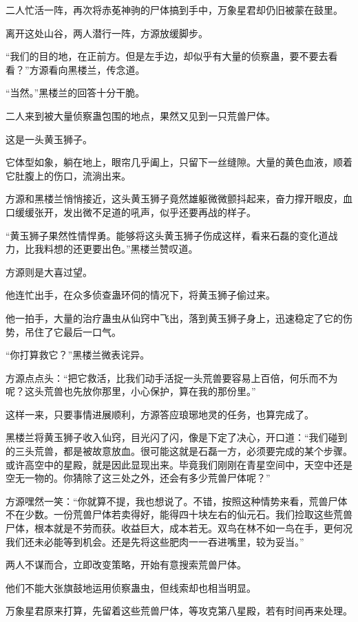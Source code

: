\begin{this_body}
二人忙活一阵，再次将赤莬神驹的尸体搞到手中，万象星君却仍旧被蒙在鼓里。

离开这处山谷，两人潜行一阵，方源放缓脚步。

“我们的目的地，在正前方。但是左手边，却似乎有大量的侦察蛊，要不要去看看？”方源看向黑楼兰，传念道。

“当然。”黑楼兰的回答十分干脆。

二人来到被大量侦察蛊包围的地点，果然又见到一只荒兽尸体。

这是一头黄玉狮子。

它体型如象，躺在地上，眼帘几乎阖上，只留下一丝缝隙。大量的黄色血液，顺着它肚腹上的伤口，流淌出来。

方源和黑楼兰悄悄接近，这头黄玉狮子竟然雄躯微微颤抖起来，奋力撑开眼皮，血口缓缓张开，发出微不足道的吼声，似乎还要再战的样子。

“黄玉狮子果然性情悍勇。能够将这头黄玉狮子伤成这样，看来石磊的变化道战力，比我料想的还更要出色。”黑楼兰赞叹道。

方源则是大喜过望。

他连忙出手，在众多侦查蛊环伺的情况下，将黄玉狮子偷过来。

他一拍手，大量的治疗蛊虫从仙窍中飞出，落到黄玉狮子身上，迅速稳定了它的伤势，吊住了它最后一口气。

“你打算救它？”黑楼兰微表诧异。

方源点点头：“把它救活，比我们动手活捉一头荒兽要容易上百倍，何乐而不为呢？这头荒兽也先放你那里，小心保护，算在我的那份里。”

这样一来，只要事情进展顺利，方源答应琅琊地灵的任务，也算完成了。

黑楼兰将黄玉狮子收入仙窍，目光闪了闪，像是下定了决心，开口道：“我们碰到的三头荒兽，都是被故意放血。很可能这就是石磊一方，必须要完成的某个步骤。或许高空中的星殿，就是因此显现出来。毕竟我们刚刚在青星空间中，天空中还是空无一物的。你猜除了这三处之外，还会有多少荒兽尸体呢？”

方源嘿然一笑：“你就算不提，我也想说了。不错，按照这种情势来看，荒兽尸体不在少数。一份荒兽尸体若卖得好，能得四十块左右的仙元石。我们捡取这些荒兽尸体，根本就是不劳而获。收益巨大，成本若无。双鸟在林不如一鸟在手，更何况我们还未必能等到机会。还是先将这些肥肉一一吞进嘴里，较为妥当。”

两人不谋而合，立即改变策略，开始有意搜索荒兽尸体。

他们不能大张旗鼓地运用侦察蛊虫，但线索却也相当明显。

万象星君原来打算，先留着这些荒兽尸体，等攻克第八星殿，若有时间再来处理。


\end{this_body}
